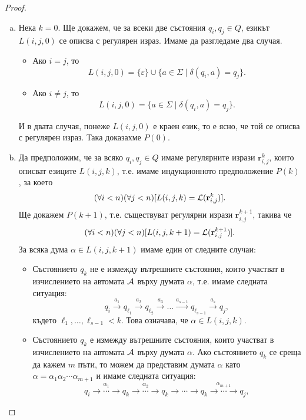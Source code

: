 \begin{proof}
  \begin{enumerate}[a)]
  \item
    Нека $k = 0$. Ще докажем, че за всеки две състояния $q_i,q_j \in Q$, езикът $L(i,j,0)$ се описва с регулярен израз.
    Имаме да разгледаме два случая.
    \begin{itemize}
    \item
      Ако $i = j$, то 
      \begin{equation}
        \label{eq:kleene-equal}
        L(i, j, 0) = \{\varepsilon\}\cup\{a\in\Sigma \mid \delta(q_i,a) = q_j\}.
      \end{equation}
    \item
      Ако $i \neq j$, то
      \[L(i, j, 0) = \{a\in\Sigma \mid \delta(q_i, a) = q_j\}.\]      
    \end{itemize}
    И в двата случая, понеже $L(i,j,0)$ е краен език, то е ясно, че той се описва с регулярен израз.
    Така доказахме $P(0)$.
  \item
    Да предположим, че за всяко $q_i,q_j\in Q$ имаме регулярните изрази $\mathbf{r}^{k}_{i,j}$, които
    описват езиците $L(i,j,k)$, т.е. имаме индукционното предположение $P(k)$, за което
    \[(\forall i < n)(\forall j < n)[L(i,j,k) = \mathcal{L}(\mathbf{r}^{k}_{i,j})].\] 
    Ще докажем $P(k+1)$, т.е. съществуват регулярни изрази $\mathbf{r}^{k+1}_{i,j}$, такива че
    \[(\forall i < n)(\forall j < n)[L(i,j,k+1) = \mathcal{L}(\mathbf{r}^{k+1}_{i,j})].\] 
    За всяка дума $\alpha \in L(i,j,k+1)$ имаме един от следните случаи:
    \begin{itemize}
    \item
      Състоянието $q_k$ не е измежду вътрешните състояния, които участват в изчислението на автомата $\mathcal{A}$ върху думата $\alpha$, т.е. имаме следната ситуация:
      \[q_i\stackrel{a_1}{\rightarrow} q_{\ell_1} \stackrel{a_2}{\rightarrow} q_{\ell_2} \stackrel{a_3}{\rightarrow} \dots \stackrel{a_{s-1}}{\rightarrow} q_{\ell_{s-1}}\stackrel{a_s}{\rightarrow} q_j,\]
      където $\ell_1,\dots,\ell_{s-1} < k$.
      Това означава, че $\alpha \in L(i,j,k)$.
    \item
      Състоянието $q_k$ е измежду вътрешните състояния, които участват в изчислението на автомата $\mathcal{A}$ върху думата $\alpha$.
      Ако състоянието $q_k$ се среща да кажем $m$ пъти, то можем да представим думата $\alpha$ като $\alpha = \alpha_1\alpha_2\cdots\alpha_{m+1}$ и имаме следната ситуация:
      \[q_i\stackrel{\alpha_1}{\rightarrow\cdots\rightarrow} q_{k} \stackrel{\alpha_2}{\rightarrow\cdots\rightarrow} q_k \rightarrow\cdots\rightarrow q_{k} \stackrel{\alpha_{m+1}}{\rightarrow\cdots\rightarrow} q_j,\]

\end{itemize}
\end{enumerate}
\end{proof}
